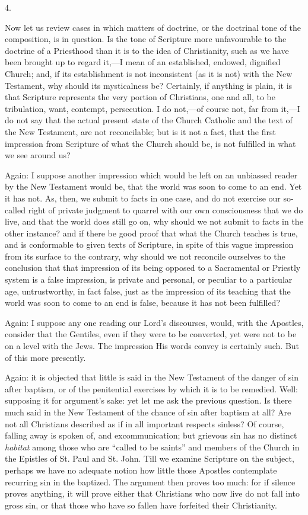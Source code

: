 4.

Now let us review cases in which matters of doctrine, or the
doctrinal tone of the composition, is in question. Is the tone of
Scripture more unfavourable to the doctrine of a Priesthood than it is
to the idea of Christianity, such as we have been brought up to regard
it,—I mean of an established, endowed, dignified Church; and, if its
establishment is not inconsistent (as it is not) with the New
Testament, why should its mysticalness be? Certainly, if anything is
plain, it is that Scripture represents the very portion of Christians,
one and all, to be tribulation, want, contempt, persecution. I do not,—of
course not, far from it,—I do not say that the actual present
state of the Church Catholic and the text of the New Testament, are
not reconcilable; but is it not a fact, that the first impression from
Scripture of what the Church should be, is not fulfilled in what we
see around us?

Again: I suppose another impression which would be left on an
unbiassed reader by the New Testament would be, that the world was
soon to come to an end. Yet it has not. As, then, we submit to facts
in one case, and do not exercise our so-called right of private
judgment to quarrel with our own consciousness that we do live, and
that the world does still go on, why should we not submit to facts in
the other instance? and if there be good proof that what the Church
teaches is true, and is conformable to given texts of Scripture, in
spite of this vague impression from its surface to the contrary, why
should we not reconcile ourselves to the conclusion that that
impression of its being opposed to a Sacramental or Priestly system is
a false impression, is private and personal, or peculiar to a
particular age, untrustworthy, in fact false, just as the impression
of its teaching that the world was soon to come to an end is false,
because it has not been fulfilled?

Again: I suppose any one reading our Lord's discourses, would, with
the Apostles, consider that the Gentiles, even if they were to be
converted, yet were not to be on a level with the Jews. The impression
His words convey is certainly such. But of this more presently.

Again: it is objected that little is said in the New Testament of
the danger of sin after baptism, or of the penitential exercises by
which it is to be remedied. Well: supposing it for argument's sake:
yet let me ask the previous question. Is there much said in the New
Testament of the chance of sin after baptism at all? Are not all
Christians described as if in all important respects sinless? Of
course, falling away is spoken of, and excommunication; but grievous
sin has no distinct \emph{habitat} among those who are ``called to
be saints'' and members of the Church in the Epistles of St. Paul
and St. John. Till we examine Scripture on the subject, perhaps we
have no adequate notion how little those Apostles contemplate
recurring sin in the baptized. The argument then proves too much: for
if silence proves anything, it will prove either that Christians who
now live do not fall into gross sin, or that those who have so fallen
have forfeited their Christianity.

